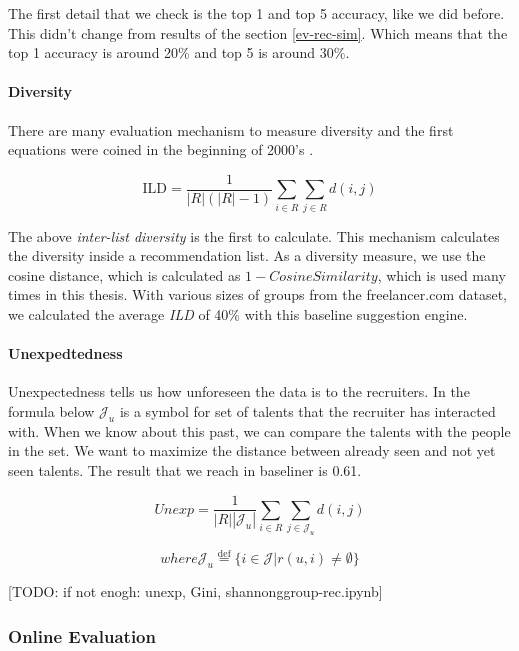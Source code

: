The first detail that we check is the top 1 and top 5 accuracy, like we did before. This didn't change from results of the section \ref{ev-rec-sim}. Which means that the top 1 accuracy is around 20\% and top 5 is around 30\%.

\paragraph{Diversity}\label{ev-unsupervised-group-diversity}

There are many evaluation mechanism to measure diversity and the first equations were coined in the beginning of 2000's \cite{smyth2001similarity}.

$$\mathrm { ILD } = \frac { 1 } { | R | ( | R | - 1 ) } \sum _ { i \in R } \sum _ { j \in R } d ( i , j )$$

The above \textit{inter-list diversity} is the first to calculate. This mechanism calculates the diversity inside a recommendation list. As a diversity measure, we use the cosine distance, which is calculated as $1 - Cosine Similarity$, which is used many times in this thesis. With various sizes of groups from the freelancer.com dataset, we calculated the average \textit{ILD} of 40\% with this baseline suggestion engine.

\paragraph{Unexpedtedness}\label{ev-unsupervised-group-unexpectedness}

Unexpectedness tells us how unforeseen the data is to the recruiters.  In the formula below $\mathcal { J } _ { u }$ is a symbol for set of talents that the recruiter has interacted with. When we know about this past, we can compare the talents with the people in the set. We want to maximize the distance between already seen and not yet seen talents. The result that we reach in baseliner is 0.61.

$$
Unexp = \frac { 1 } { | R | \left| \mathcal { J } _ { u } \right| } \sum _ { i \in R } \sum _ { j \in \mathcal { J } _ { u } } d ( i , j )
$$

$$
where 
\mathcal { J } _ { u } \stackrel { \mathrm { def } } { = } \{ i \in \mathcal { J } | r ( u , i ) \neq \emptyset \}
$$

[TODO: if not enogh: unexp, Gini, shannonggroup-rec.ipynb]

\subsubsection{Online Evaluation}

